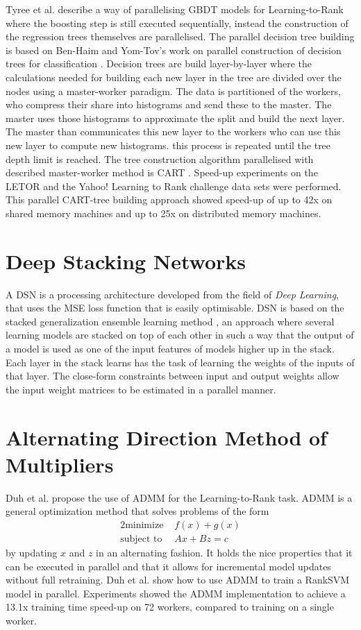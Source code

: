Tyree et al. \cite{Tyree2011} describe a way of parallelising \ac{GBDT} models for Learning-to-Rank where the boosting step is still executed sequentially, instead the construction of the regression trees themselves are parallelised. The parallel decision tree building is based on Ben-Haim and Yom-Tov's work on parallel construction of decision trees for classification \cite{Ben-Haim2010}. Decision trees are build layer-by-layer where the calculations needed for building each new layer in the tree are divided over the nodes using a master-worker paradigm. The data is partitioned of the workers, who compress their share into histograms and send these to the master. The master uses those histograms to approximate the split and build the next layer. The master than communicates this new layer to the workers who can use this new layer to compute new histograms. this process is repeated until the tree depth limit is reached. The tree construction algorithm parallelised with described master-worker method is \ac{CART} \cite{Breiman1984}. Speed-up experiments on the LETOR and the Yahoo! Learning to Rank challenge data sets were performed. This parallel \ac{CART}-tree building approach showed speed-up of up to 42x on shared memory machines and up to 25x on distributed memory machines.
\section{Deep Stacking Networks}
A \ac{DSN} is a processing architecture developed from the field of \emph{Deep Learning}, that uses the \ac{MSE} loss function that is easily optimisable. \ac{DSN} is based on the stacked generalization ensemble learning method \cite{Wolpert1992}, an approach where several learning models are stacked on top of each other in such a way that the output of a model is used as one of the input features of models higher up in the stack. Each layer in the stack learns has the task of learning the weights of the inputs of that layer. The close-form constraints between input and output weights allow the input weight matrices to be estimated in a parallel manner.
\section{Alternating Direction Method of Multipliers}
Duh et al. \cite{Duh2011} propose the use of \ac{ADMM} for the Learning-to-Rank task. \ac{ADMM} is a general optimization method that solves problems of the form
\begin{alignat*}{2}
\text{minimize }   &  f(x) + g(x) \\
\text{subject to } &  Ax + Bz = c
\end{alignat*}
by updating $x$ and $z$ in an alternating fashion. It holds the nice properties that it can be executed in parallel and that it allows for incremental model updates without full retraining. Duh et al. \cite{Duh2011} show how to use \ac{ADMM} to train a RankSVM model in parallel. Experiments showed the \ac{ADMM} implementation to achieve a 13.1x training time speed-up on 72 workers, compared to training on a single worker.\\


